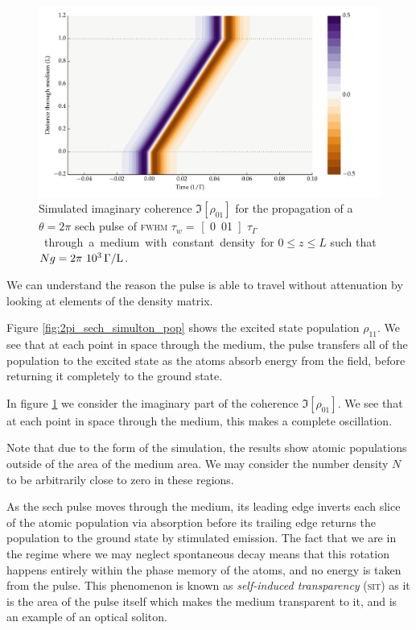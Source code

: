     \begin{figure}[]
      \includegraphics[width=\linewidth]
        {figs/03_nonlinear/coh_sech_2_0pi_fwhm0_010_Ng01000_fig3.pdf}
      \caption{
        Simulated imaginary coherence $\Im \left[ {\rho_{01}} \right]$ for the
        propagation of a $\theta = 2\pi$ sech pulse of \textsc{fwhm} $\tau_w = $
        \unit[0.01]{$\tau_\Gamma$} through a medium with constant density for $0
        \le z \le L$ such that $Ng = \unit[2\pi~10^3]{\Gamma/L}$.
      }
      \label{fig:2pi_sech_simulton_coh}
    \end{figure}

    We can understand the reason the pulse is able to travel without attenuation
    by looking at elements of the density matrix. 

    Figure \ref{fig:2pi_sech_simulton_pop} shows the excited state population
    $\rho_{11}$. We see that at each point in space through the medium, the
    pulse transfers all of the population to the excited state as the atoms
    absorb energy from the field, before returning it completely to the ground
    state.

    In figure \ref{fig:2pi_sech_simulton_coh} we consider the imaginary part of
    the coherence $\Im\left[{\rho_{01}}\right]$. We see that at each point in space through
    the medium, this makes a complete oscillation.

    Note that due to the form of the simulation, the results show atomic
    populations outside of the area of the medium area. We may consider the
    number density $N$ to be arbitrarily close to zero in these regions.

    As the sech pulse moves through the medium, its leading edge inverts each
    slice of the atomic population via absorption before its trailing edge
    returns the population to the ground state by stimulated
    emission.\cite{Lamb1971} The fact that we are in the regime where we may
    neglect spontaneous decay means that this rotation happens entirely within
    the phase memory of the atoms, and no energy is taken from the pulse. This
    phenomenon is known as \textit{self-induced transparency} (\textsc{sit}) as
    it is the area of the pulse itself which makes the medium transparent to it,
    and is an example of an optical soliton\cite{kivshar2003optical}.

